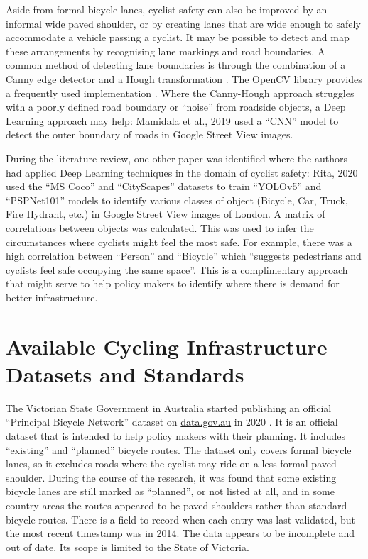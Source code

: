 \documentclass[11pt,twoside]{report}
\begin{document}
Aside from formal bicycle lanes, cyclist safety can also be improved by an informal wide paved shoulder, or by creating lanes that are wide enough to safely accommodate a vehicle passing a cyclist.  It may be possible to detect and map these arrangements by recognising lane markings and road boundaries.  A common method of detecting lane boundaries is through the combination of a Canny edge detector \cite{canny} and a Hough transformation \cite{hough}.  The OpenCV library provides a frequently used implementation \cite{opencv}.  Where the Canny-Hough approach struggles with a poorly defined road boundary or ``noise'' from roadside objects, a Deep Learning approach may help:  Mamidala et al., 2019 \cite{8929655} used a ``CNN'' model to detect the outer boundary of roads in Google Street View images.

During the literature review, one other paper was identified where the authors had applied Deep Learning techniques in the domain of cyclist safety:  Rita, 2020 \cite{rita_2020} used the ``MS Coco'' and ``CityScapes'' datasets to train ``YOLOv5'' and ``PSPNet101'' models to identify various classes of object (Bicycle, Car, Truck, Fire Hydrant, etc.) in Google Street View images of London.  A matrix of correlations between objects was calculated.  This was used to infer the circumstances where cyclists might feel the most safe.  For example, there was a high correlation between ``Person'' and ``Bicycle'' which ``suggests pedestrians and cyclists feel safe occupying the same space''.  This is a complimentary approach that might serve to help policy makers to identify where there is demand for better infrastructure.


\section{Available Cycling Infrastructure Datasets and Standards}
\label{s:datasets}

The Victorian State Government in Australia started publishing an official ``Principal Bicycle Network'' dataset on \url{data.gov.au} in 2020 \cite{PrincipalBicycleNetwork}.  It is an official dataset that is intended to help policy makers with their planning.  It includes ``existing'' and ``planned'' bicycle routes.  The dataset only covers formal bicycle lanes, so it excludes roads where the cyclist may ride on a less formal paved shoulder.  During the course of the research, it was found that some existing bicycle lanes are still marked as ``planned'', or not listed at all, and in some country areas the routes appeared to be paved shoulders rather than standard bicycle routes.  There is a field to record when each entry was last validated, but the most recent timestamp was in 2014.  The data appears to be incomplete and out of date.  Its scope is limited to the State of Victoria.
\end{document}

